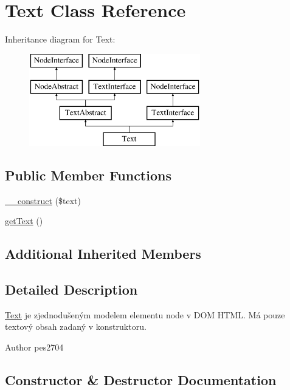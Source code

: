 \hypertarget{class_pes_1_1_dom_1_1_node_1_1_text_1_1_text}{}\section{Text Class Reference}
\label{class_pes_1_1_dom_1_1_node_1_1_text_1_1_text}
Inheritance diagram for Text\+:\begin{figure}[H]
\begin{center}
\leavevmode
\includegraphics[height=4.000000cm]{class_pes_1_1_dom_1_1_node_1_1_text_1_1_text}
\end{center}
\end{figure}
\subsection*{Public Member Functions}
\begin{DoxyCompactItemize}
\item 
\mbox{\hyperlink{class_pes_1_1_dom_1_1_node_1_1_text_1_1_text_a29f6e9abaa4fb1c43e6a790fbe681bb9}{\+\_\+\+\_\+construct}} (\$text)
\item 
\mbox{\hyperlink{class_pes_1_1_dom_1_1_node_1_1_text_1_1_text_a8a2999b1d846c0a7bc77187e28facd99}{get\+Text}} ()
\end{DoxyCompactItemize}
\subsection*{Additional Inherited Members}


\subsection{Detailed Description}
\mbox{\hyperlink{class_pes_1_1_dom_1_1_node_1_1_text_1_1_text}{Text}} je zjednodušeným modelem elementu node v D\+OM H\+T\+ML. Má pouze textový obsah zadaný v konstruktoru.

\begin{DoxyAuthor}{Author}
pes2704 
\end{DoxyAuthor}


\subsection{Constructor \& Destructor Documentation}
\mbox{\label{class_pes_1_1_dom_1_1_node_1_1_text_1_1_text_a29f6e9abaa4fb1c43e6a790fbe681bb9}} 
